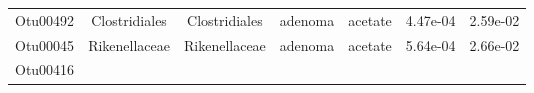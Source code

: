 \documentclass[11pt,]{article}
\begin{document}
\begin{longtable}[]{@{}ccccccc@{}}
\begin{minipage}[t]{0.09\columnwidth}\centering\strut
Otu00492\strut
\end{minipage} & \begin{minipage}[t]{0.17\columnwidth}\centering\strut
Clostridiales\strut
\end{minipage} & \begin{minipage}[t]{0.17\columnwidth}\centering\strut
Clostridiales\strut
\end{minipage} & \begin{minipage}[t]{0.09\columnwidth}\centering\strut
adenoma\strut
\end{minipage} & \begin{minipage}[t]{0.11\columnwidth}\centering\strut
acetate\strut
\end{minipage} & \begin{minipage}[t]{0.09\columnwidth}\centering\strut
4.47e-04\strut
\end{minipage} & \begin{minipage}[t]{0.09\columnwidth}\centering\strut
2.59e-02\strut
\end{minipage}\tabularnewline
\begin{minipage}[t]{0.09\columnwidth}\centering\strut
Otu00045\strut
\end{minipage} & \begin{minipage}[t]{0.17\columnwidth}\centering\strut
Rikenellaceae\strut
\end{minipage} & \begin{minipage}[t]{0.17\columnwidth}\centering\strut
Rikenellaceae\strut
\end{minipage} & \begin{minipage}[t]{0.09\columnwidth}\centering\strut
adenoma\strut
\end{minipage} & \begin{minipage}[t]{0.11\columnwidth}\centering\strut
acetate\strut
\end{minipage} & \begin{minipage}[t]{0.09\columnwidth}\centering\strut
5.64e-04\strut
\end{minipage} & \begin{minipage}[t]{0.09\columnwidth}\centering\strut
2.66e-02\strut
\end{minipage}\tabularnewline
\begin{minipage}[t]{0.09\columnwidth}\centering\strut
Otu00416\strut
\end{minipage} & \begin{minipage}[t]{0.17\columnwidth}\centering\strut

\end{minipage}
\end{longtable}
\end{document}

